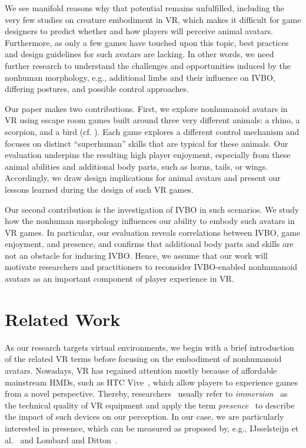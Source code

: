 \documentclass{sigchi}
\begin{document}
We see manifold reasons why that potential remains unfulfilled, including the very few studies on creature embodiment in VR, which makes it difficult for game designers to predict whether and how players will perceive animal avatars. Furthermore, as only a few games have touched upon this topic, best practices and design guidelines for such avatars are lacking. In other words, we need further research to understand the challenges and opportunities induced by the nonhuman morphology, e.g., additional limbs and their influence on IVBO, differing postures, and possible control approaches.

Our paper makes two contributions. First, we explore nonhumanoid avatars in VR using escape room games built around three very different animals: a rhino, a scorpion, and a bird (cf. ). Each game explores a different control mechanism and focuses on distinct ``superhuman'' skills that are typical for these animals. Our evaluation underpins the resulting high player enjoyment, especially from these animal abilities and additional body parts, such as horns, tails, or wings. Accordingly, we draw design implications for animal avatars and present our lessons learned during the design of such VR games.


Our second contribution is the investigation of IVBO in such scenarios. We study how the nonhuman morphology influences our ability to embody such avatars in VR games. In particular, our evaluation reveals correlations between IVBO, game enjoyment, and presence, and confirms that additional body parts and skills are not an obstacle for inducing IVBO. Hence, we assume that our work will motivate researchers and practitioners to reconsider IVBO-enabled nonhumanoid avatars as an important component of player experience in VR.





\section{Related Work}






As our research targets virtual environments, we begin with a brief introduction of the related VR terms before focusing on the embodiment of nonhumanoid avatars. Nowadays, VR has regained attention mostly because of affordable mainstream HMDs, such as HTC Vive~, which allow players to experience games from a novel perspective. Thereby, researchers~\cite{Biocca:1995:IVR:207922.207926,sherman2002understanding} usually refer to \textit{immersion}~\cite{cairns2014immersion} as the technical quality of VR equipment and apply the term \textit{presence}~\cite{slater1995taking, slater2003note} to describe the impact of such devices on our perception. In our case, we are particularly interested in presence, which can be measured as proposed by, e.g., IJsselsteijn et al.~ and Lombard and Ditton~.
\end{document}
